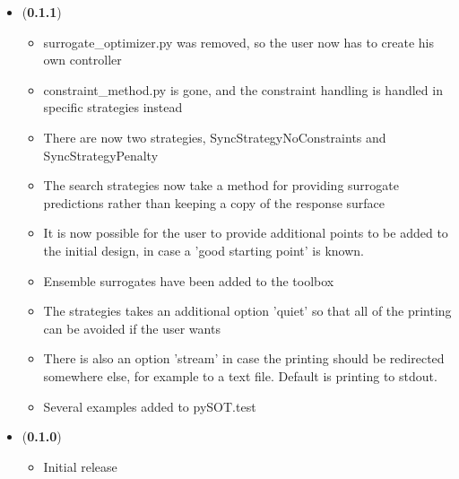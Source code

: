 \documentclass[]{article}
\begin{document}
\begin{itemize}
	\item (\textbf{0.1.1})
	\begin{itemize}
		\item surrogate\_optimizer.py was removed, so the user now has to create his own controller
		\item constraint\_method.py is gone, and the constraint handling is handled in specific 
		strategies instead
		\item 	There are now two strategies, SyncStrategyNoConstraints and SyncStrategyPenalty
		\item The search strategies now take a method for providing surrogate predictions rather 
		than keeping a copy of the response surface
		\item It is now possible for the user to provide additional points to be added to the initial 
		design, in case a 'good starting point' is known.
		\item Ensemble surrogates have been added to the toolbox
		\item 	The strategies takes an additional option 'quiet' so that all of the printing can be 
		avoided if the user wants
		\item There is also an option 'stream' in case the printing should be redirected somewhere 
		else, for example to a text file. Default is printing to stdout.
		\item 	Several examples added to pySOT.test
	\end{itemize}
	
	\item (\textbf{0.1.0})
	\begin{itemize}
		\item 	Initial release
	\end{itemize}
\end{itemize}
\end{document}
